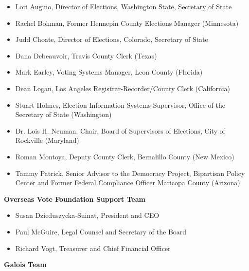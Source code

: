 \begin{itemize}

\item Lori Augino, Director of Elections, Washington State, Secretary
  of State

\item Rachel Bohman, Former Hennepin County Elections Manager
  (Minnesota)

\item Judd Choate, Director of Elections, Colorado, Secretary of State

\item Dana Debeauvoir, Travis County Clerk (Texas)
 
\item Mark Earley, Voting Systems Manager, Leon County (Florida)
 
\item Dean Logan, Los Angeles Registrar-Recorder/County Clerk
  (California)

\item Stuart Holmes, Election Information Systems Supervisor, Office
  of the Secretary of State (Washington)
 
\item Dr. Lois H. Neuman, Chair, Board of Supervisors of Elections,
  City of Rockville (Maryland)
 
\item Roman Montoya, Deputy County Clerk, Bernalillo County (New
  Mexico)
 
\item Tammy Patrick, Senior Advisor to the Democracy Project,
  Bipartisan Policy Center and Former Federal Compliance Officer
  Maricopa County (Arizona)

\end{itemize}

\textbf{Overseas Vote Foundation Support Team}

\begin{itemize}

\item Susan Dzieduszycka-Suinat, President and CEO
 
\item Paul McGuire, Legal Counsel and Secretary of the Board
 
\item Richard Vogt, Treasurer and Chief Financial Officer

\end{itemize}

\textbf{Galois Team}

